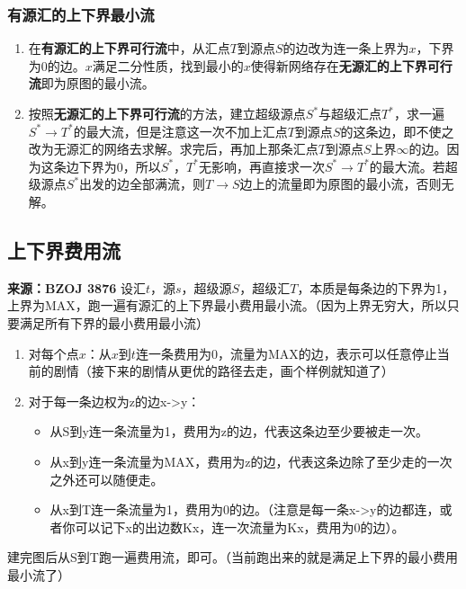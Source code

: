 \documentclass[a4paper,openany]{book}
\begin{document}
\begin{spacing}{0.9}
			\subsubsection*{有源汇的上下界最小流}
			\begin{enumerate}
				\item 在\textbf{有源汇的上下界可行流}中，从汇点$T$到源点$S$的边改为连一条上界为$x$，下界为$0$的边。$x$满足二分性质，找到最小的$x$使得新网络存在\textbf{无源汇的上下界可行流}即为原图的最小流。
				\item 按照\textbf{无源汇的上下界可行流}的方法，建立超级源点$S^*$与超级汇点$T^*$，求一遍$S^* \rightarrow T^*$的最大流，但是注意这一次不加上汇点$T$到源点$S$的这条边，即不使之改为无源汇的网络去求解。求完后，再加上那条汇点$T$到源点$S$上界$\infty$的边。因为这条边下界为$0$，所以$S^*$，$T^*$无影响，再直接求一次$S^* \rightarrow T^*$的最大流。若超级源点$S^*$出发的边全部满流，则$T \rightarrow S$边上的流量即为原图的最小流，否则无解。
			\end{enumerate}
			\subsection*{上下界费用流}
			\noindent \textbf{来源：BZOJ 3876}
			\noindent 设汇$t$，源$s$，超级源$S$，超级汇$T$，本质是每条边的下界为1，上界为MAX，跑一遍有源汇的上下界最小费用最小流。（因为上界无穷大，所以只要满足所有下界的最小费用最小流）
			\begin{enumerate}
				\item 对每个点$x$：从$x$到$t$连一条费用为0，流量为MAX的边，表示可以任意停止当前的剧情（接下来的剧情从更优的路径去走，画个样例就知道了）
				\item 对于每一条边权为z的边x->y：
				\begin{itemize}
					\item 从S到y连一条流量为1，费用为z的边，代表这条边至少要被走一次。
					\item 从x到y连一条流量为MAX，费用为z的边，代表这条边除了至少走的一次之外还可以随便走。
					\item 从x到T连一条流量为1，费用为0的边。（注意是每一条x->y的边都连，或者你可以记下x的出边数Kx，连一次流量为Kx，费用为0的边）。
				\end{itemize}
			\end{enumerate}
			建完图后从S到T跑一遍费用流，即可。（当前跑出来的就是满足上下界的最小费用最小流了）

\end{spacing}
\end{document}
